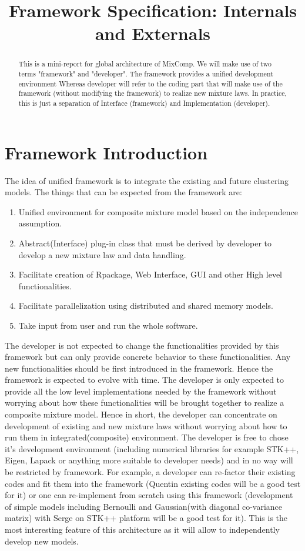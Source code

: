 \documentclass[a4paper,11pt]{article}
\title{Framework Specification: Internals and Externals}
\begin{document}
\maketitle
\tableofcontents

\begin{abstract}
This is a mini-report for global architecture of MixComp. We will make use of two terms "framework" and "developer". The framework provides a unified development environment Whereas developer will refer to the coding part that will make use of the framework (without modifying the framework) to realize new mixture laws. In practice, this is just a separation of Interface (framework) and Implementation (developer).  
\end{abstract}
\section{Framework Introduction}
The idea of unified framework is to integrate the existing and future clustering models. The things that can be expected from the framework are:
\begin{enumerate}
\item Unified environment for composite mixture model based on the independence assumption.
\item Abstract(Interface) plug-in class that must be derived by developer to develop a new mixture law and data handling.
\item Facilitate creation of Rpackage, Web Interface, GUI and other High level functionalities.
\item Facilitate parallelization using distributed and shared memory models.
\item Take input from user and run the whole software.
\end{enumerate}

The developer is not expected to change the functionalities provided by this framework but can only provide concrete behavior to these functionalities. Any new functionalities should be first introduced in the framework. Hence the framework is expected to evolve with time. The developer is only expected to provide all the low level implementations needed by the framework without worrying about how these functionalities will be brought together to realize a composite mixture model. Hence in short, the developer can concentrate on development of existing and new mixture laws without worrying about how to run them in integrated(composite) environment. The developer is free to chose it's development environment (including numerical libraries for example STK++, Eigen, Lapack or anything more suitable to developer needs) and in no way will be restricted by framework. For example, a developer can re-factor their existing codes and fit them into the framework (Quentin existing codes will be a good test for it) or one can re-implement from scratch  using this framework (development of simple models including Bernoulli and Gaussian(with diagonal co-variance matrix) with Serge on STK++ platform will be a good test for it). This is the most interesting feature of this architecture as it will allow to independently develop new models. 
\end{document}
